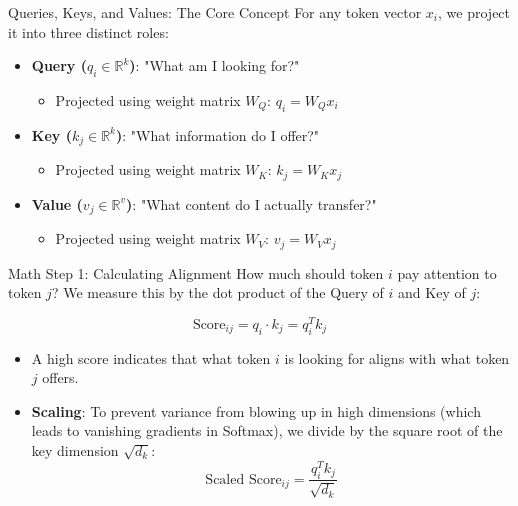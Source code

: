 \documentclass[aspectratio=169]{beamer}
\begin{document}
\begin{frame}{Queries, Keys, and Values: The Core Concept}
  For any token vector $x_i$, we project it into three distinct roles:
  
  \begin{itemize}
    \item \textbf{Query ($q_i \in \mathbb{R}^k$)}: "What am I looking for?"
      \begin{itemize}
        \item Projected using weight matrix $W_Q$: $q_i = W_Q x_i$
      \end{itemize}
    \item \textbf{Key ($k_j \in \mathbb{R}^k$)}: "What information do I offer?"
      \begin{itemize}
        \item Projected using weight matrix $W_K$: $k_j = W_K x_j$
      \end{itemize}
    \item \textbf{Value ($v_j \in \mathbb{R}^v$)}: "What content do I actually transfer?"
      \begin{itemize}
        \item Projected using weight matrix $W_V$: $v_j = W_V x_j$
      \end{itemize}
  \end{itemize}
\end{frame}

\begin{frame}{Math Step 1: Calculating Alignment}
  How much should token $i$ pay attention to token $j$? We measure this by the dot product of the Query of $i$ and Key of $j$:
  
  \[
  \text{Score}_{ij} = q_i \cdot k_j = q_i^T k_j
  \]
  
  \begin{itemize}
    \item A high score indicates that what token $i$ is looking for aligns with what token $j$ offers.
    \item \textbf{Scaling}: To prevent variance from blowing up in high dimensions (which leads to vanishing gradients in Softmax), we divide by the square root of the key dimension $\sqrt{d_k}$:
      \[
      \text{Scaled Score}_{ij} = \frac{q_i^T k_j}{\sqrt{d_k}}
      \]
  \end{itemize}
\end{frame}
\end{document}
